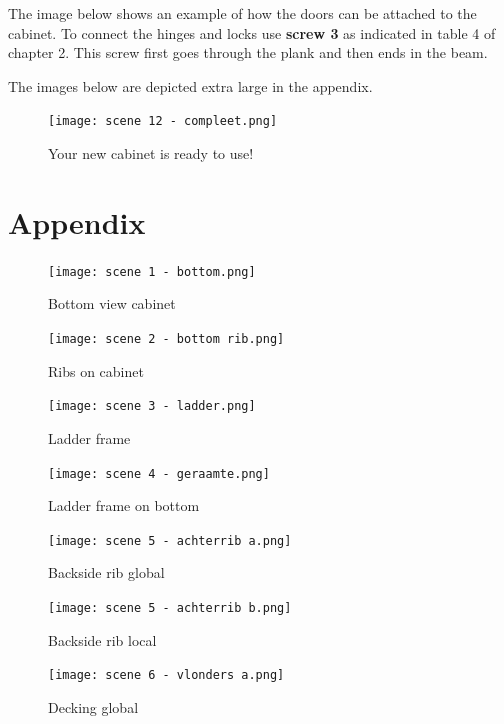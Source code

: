 \documentclass{article}
\begin{document}


The image below shows an example of how the doors can be attached to the cabinet. To connect the hinges and locks use \textbf{screw 3} as indicated in table 4 of chapter 2. This screw first goes through the plank and then ends in the beam.

The images below are depicted extra large in the appendix.

\begin{figure}[h!]
    \centering
    \texttt{[image: scene 12 - compleet.png]}
    \caption{Your new cabinet is ready to use!}
    \label{fig:stap 12}
\end{figure}

\clearpage
\newpage

\section{Appendix}

\begin{figure}[h!]
    \centering
    \texttt{[image: scene 1 - bottom.png]}
    \caption{Bottom view cabinet}
\end{figure}

\begin{figure}[h!]
    \centering
    \texttt{[image: scene 2 - bottom rib.png]}
    \caption{Ribs on cabinet}
\end{figure}

\begin{figure}[h!]
    \centering
    \texttt{[image: scene 3 - ladder.png]}
    \caption{Ladder frame}
\end{figure}

\begin{figure}[h!]
    \centering
    \texttt{[image: scene 4 - geraamte.png]}
    \caption{Ladder frame on bottom}
\end{figure}

\begin{figure}[h!]
    \centering
    \texttt{[image: scene 5 - achterrib a.png]}
    \caption{Backside rib global}
\end{figure}

\begin{figure}[h!]
    \centering
    \texttt{[image: scene 5 - achterrib b.png]}
    \caption{Backside rib local}
\end{figure}

\begin{figure}[h!]
    \centering
    \texttt{[image: scene 6 - vlonders a.png]}
    \caption{Decking global}
\end{figure}
\end{document}
